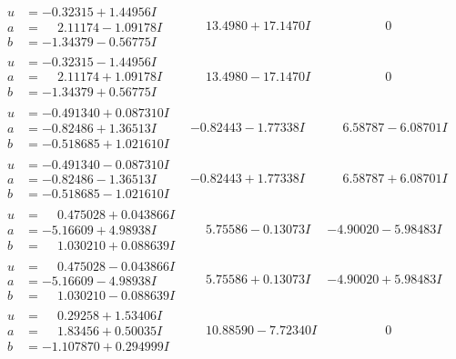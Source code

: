 \documentclass[1p]{elsarticle_modified}
\theoremstyle{definition}
\begin{document}
$$\begin{array}{c|c|c}
\begin{aligned}
u &= -0.32315 + 1.44956 I \\
a &= \phantom{-}2.11174 - 1.09178 I \\
b &= -1.34379 - 0.56775 I\end{aligned}
 & \phantom{-}13.4980 + 17.1470 I & \phantom{-0.000000 } 0 \\ \hline\begin{aligned}
u &= -0.32315 - 1.44956 I \\
a &= \phantom{-}2.11174 + 1.09178 I \\
b &= -1.34379 + 0.56775 I\end{aligned}
 & \phantom{-}13.4980 - 17.1470 I & \phantom{-0.000000 } 0 \\ \hline\begin{aligned}
u &= -0.491340 + 0.087310 I \\
a &= -0.82486 + 1.36513 I \\
b &= -0.518685 + 1.021610 I\end{aligned}
 & -0.82443 - 1.77338 I & \phantom{-}6.58787 - 6.08701 I \\ \hline\begin{aligned}
u &= -0.491340 - 0.087310 I \\
a &= -0.82486 - 1.36513 I \\
b &= -0.518685 - 1.021610 I\end{aligned}
 & -0.82443 + 1.77338 I & \phantom{-}6.58787 + 6.08701 I \\ \hline\begin{aligned}
u &= \phantom{-}0.475028 + 0.043866 I \\
a &= -5.16609 + 4.98938 I \\
b &= \phantom{-}1.030210 + 0.088639 I\end{aligned}
 & \phantom{-}5.75586 - 0.13073 I & -4.90020 - 5.98483 I \\ \hline\begin{aligned}
u &= \phantom{-}0.475028 - 0.043866 I \\
a &= -5.16609 - 4.98938 I \\
b &= \phantom{-}1.030210 - 0.088639 I\end{aligned}
 & \phantom{-}5.75586 + 0.13073 I & -4.90020 + 5.98483 I \\ \hline\begin{aligned}
u &= \phantom{-}0.29258 + 1.53406 I \\
a &= \phantom{-}1.83456 + 0.50035 I \\
b &= -1.107870 + 0.294999 I\end{aligned}
 & \phantom{-}10.88590 - 7.72340 I & \phantom{-0.000000 } 0 \\ \hline\begin{aligned}

\end{aligned}
\end{array}$$
\end{document}
